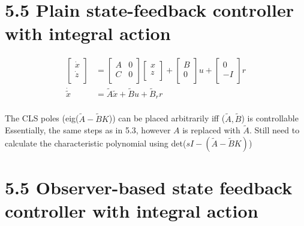 \section*{5.5 Plain state-feedback controller with integral action}

\begin{equation*}
    \begin{aligned}
        \begin{bmatrix}
            \dot{x} \\
            \dot{z} \\
        \end{bmatrix} & = \begin{bmatrix}
            A & 0 \\
            C & 0 \\
        \end{bmatrix}\begin{bmatrix}
            x \\
            z \\
        \end{bmatrix} + \begin{bmatrix}
            B \\
            0 \\
        \end{bmatrix}u + \begin{bmatrix}
            0  \\
            -I \\
        \end{bmatrix}r \\
        \dot{\tilde{x}}            & = \tilde{A}\tilde{x} + \tilde{B}u + \tilde{B}_r r                                                                  \\
    \end{aligned}
\end{equation*}

The CLS poles (eig(\( \tilde{A} - \tilde{B} K \))) can be placed arbitrarily iff (\( \tilde{A}, \tilde{B}\)) is controllable
Essentially, the same steps as in 5.3, however \( A \) is replaced with \( \tilde{A} \).
Still need to calculate the characteristic polynomial using det(\( sI - (\tilde{A} - \tilde{B}K) \))

\section*{5.5 Observer-based state feedback controller with integral action}

